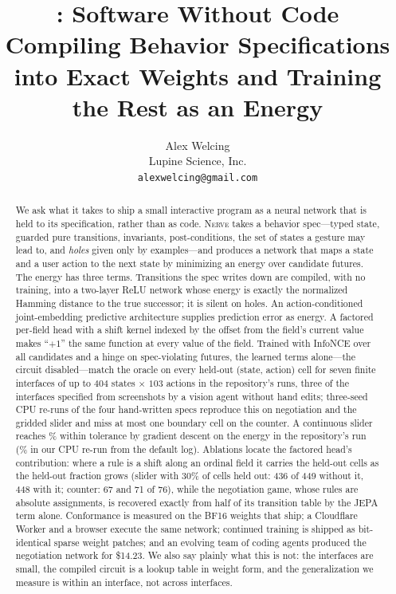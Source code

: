 \documentclass{article}
\title{\method: Software Without Code\\
\large Compiling Behavior Specifications into Exact Weights and Training the Rest as an Energy}
\author{%
  Alex Welcing\\
  Lupine Science, Inc.\\
  \texttt{alexwelcing@gmail.com}\\
}
\theoremstyle{plain}
\theoremstyle{definition}
\theoremstyle{remark}
\newcommand{\method}{\textsc{Nerve}\xspace}
\begin{document}
\maketitle

\begin{abstract}
We ask what it takes to ship a small interactive program as a neural network that is held to its specification, rather than as code. \method takes a behavior spec---typed state, guarded pure transitions, invariants, post-conditions, the set of states a gesture may lead to, and \emph{holes} given only by examples---and produces a network that maps a state and a user action to the next state by minimizing an energy over candidate futures. The energy has three terms. Transitions the spec writes down are compiled, with no training, into a two-layer ReLU network whose energy is exactly the normalized Hamming distance to the true successor; it is silent on holes. An action-conditioned joint-embedding predictive architecture supplies prediction error as energy. A factored per-field head with a shift kernel indexed by the offset from the field's current value makes ``$+1$'' the same function at every value of the field. Trained with InfoNCE over all candidates and a hinge on spec-violating futures, the learned terms alone---the circuit disabled---match the oracle on every held-out (state, action) cell for seven finite interfaces of up to $404$ states $\times$ $103$ actions in the repository's runs, three of the interfaces specified from screenshots by a vision agent without hand edits; three-seed CPU re-runs of the four hand-written specs reproduce this on negotiation and the gridded slider and miss at most one boundary cell on the counter. A continuous slider reaches \contexact{}\% within tolerance by gradient descent on the energy in the repository's run (\contexactcpupct{}\% in our CPU re-run from the default log). Ablations locate the factored head's contribution: where a rule is a shift along an ordinal field it carries the held-out cells as the held-out fraction grows (slider with 30\% of cells held out: 436 of 449 without it, 448 with it; counter: 67 and 71 of 76), while the negotiation game, whose rules are absolute assignments, is recovered exactly from half of its transition table by the JEPA term alone. Conformance is measured on the BF16 weights that ship; a Cloudflare Worker and a browser execute the same network; continued training is shipped as bit-identical sparse weight patches; and an evolving team of coding agents produced the negotiation network for \$14.23. We also say plainly what this is not: the interfaces are small, the compiled circuit is a lookup table in weight form, and the generalization we measure is within an interface, not across interfaces.
\end{abstract}
\end{document}
